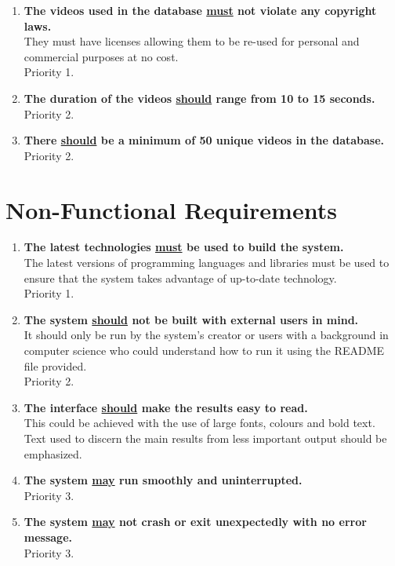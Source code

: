 \begin{enumerate}[label=F\arabic*,resume]

    \item \textbf{The videos used in the database \underline{must} not violate any copyright laws.}\\
    They must have licenses allowing them to be re-used for personal and commercial purposes at no cost.\\
    Priority 1.
    
    \item \textbf{The duration of the videos \underline{should} range from 10 to 15 seconds.}\\
    Priority 2.

    \item \textbf{There \underline{should} be a minimum of 50 unique videos in the database.}\\
    Priority 2.
        
\end{enumerate}

\section{Non-Functional Requirements}

\begin{enumerate}[label=NF\arabic*]

    \item \textbf{The latest technologies \underline{must} be used to build the system.}\\
	The latest versions of programming languages and libraries must be used to ensure that the system takes advantage of up-to-date technology.\\
	Priority 1.
	
	\item \textbf{The system \underline{should} not be built with external users in mind.}\\
	It should only be run by the system's creator or users with a background in computer science who could understand how to run it using the README file provided.\\
	Priority 2.

    \item \textbf{The interface \underline{should} make the results easy to read.}\\
    This could be achieved with the use of large fonts, colours and bold text. Text used to discern the main results from less important output should be emphasized.
    
    \item \textbf{The system \underline{may} run smoothly and uninterrupted.}\\
    Priority 3.
    
    \item \textbf{The system \underline{may} not crash or exit unexpectedly with no error message.}\\
    Priority 3.

\end{enumerate}


